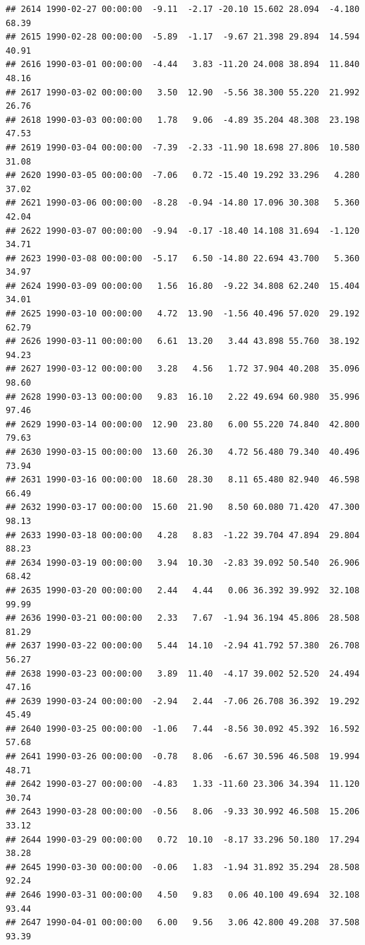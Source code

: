 \documentclass{article}\usepackage{graphicx, color}
\makeatletter
\newenvironment{kframe}{%
 \def\at@end@of@kframe{}%
 \ifinner\ifhmode%
  \def\at@end@of@kframe{\end{minipage}}%
  \begin{minipage}{\columnwidth}%
 \fi\fi%
 \def\FrameCommand##1{\hskip\@totalleftmargin \hskip-\fboxsep
 \colorbox{shadecolor}{##1}\hskip-\fboxsep
     \hskip-\linewidth \hskip-\@totalleftmargin \hskip\columnwidth}%
 \MakeFramed {\advance\hsize-\width
   \@totalleftmargin\z@ \linewidth\hsize
   \@setminipage}}%
 {\par\unskip\endMakeFramed%
 \at@end@of@kframe}
\newenvironment{knitrout}{}{} %
\makeatother
\begin{document}
\begin{knitrout}
\begin{kframe}
\begin{verbatim}
## 2614 1990-02-27 00:00:00  -9.11  -2.17 -20.10 15.602 28.094  -4.180  68.39
## 2615 1990-02-28 00:00:00  -5.89  -1.17  -9.67 21.398 29.894  14.594  40.91
## 2616 1990-03-01 00:00:00  -4.44   3.83 -11.20 24.008 38.894  11.840  48.16
## 2617 1990-03-02 00:00:00   3.50  12.90  -5.56 38.300 55.220  21.992  26.76
## 2618 1990-03-03 00:00:00   1.78   9.06  -4.89 35.204 48.308  23.198  47.53
## 2619 1990-03-04 00:00:00  -7.39  -2.33 -11.90 18.698 27.806  10.580  31.08
## 2620 1990-03-05 00:00:00  -7.06   0.72 -15.40 19.292 33.296   4.280  37.02
## 2621 1990-03-06 00:00:00  -8.28  -0.94 -14.80 17.096 30.308   5.360  42.04
## 2622 1990-03-07 00:00:00  -9.94  -0.17 -18.40 14.108 31.694  -1.120  34.71
## 2623 1990-03-08 00:00:00  -5.17   6.50 -14.80 22.694 43.700   5.360  34.97
## 2624 1990-03-09 00:00:00   1.56  16.80  -9.22 34.808 62.240  15.404  34.01
## 2625 1990-03-10 00:00:00   4.72  13.90  -1.56 40.496 57.020  29.192  62.79
## 2626 1990-03-11 00:00:00   6.61  13.20   3.44 43.898 55.760  38.192  94.23
## 2627 1990-03-12 00:00:00   3.28   4.56   1.72 37.904 40.208  35.096  98.60
## 2628 1990-03-13 00:00:00   9.83  16.10   2.22 49.694 60.980  35.996  97.46
## 2629 1990-03-14 00:00:00  12.90  23.80   6.00 55.220 74.840  42.800  79.63
## 2630 1990-03-15 00:00:00  13.60  26.30   4.72 56.480 79.340  40.496  73.94
## 2631 1990-03-16 00:00:00  18.60  28.30   8.11 65.480 82.940  46.598  66.49
## 2632 1990-03-17 00:00:00  15.60  21.90   8.50 60.080 71.420  47.300  98.13
## 2633 1990-03-18 00:00:00   4.28   8.83  -1.22 39.704 47.894  29.804  88.23
## 2634 1990-03-19 00:00:00   3.94  10.30  -2.83 39.092 50.540  26.906  68.42
## 2635 1990-03-20 00:00:00   2.44   4.44   0.06 36.392 39.992  32.108  99.99
## 2636 1990-03-21 00:00:00   2.33   7.67  -1.94 36.194 45.806  28.508  81.29
## 2637 1990-03-22 00:00:00   5.44  14.10  -2.94 41.792 57.380  26.708  56.27
## 2638 1990-03-23 00:00:00   3.89  11.40  -4.17 39.002 52.520  24.494  47.16
## 2639 1990-03-24 00:00:00  -2.94   2.44  -7.06 26.708 36.392  19.292  45.49
## 2640 1990-03-25 00:00:00  -1.06   7.44  -8.56 30.092 45.392  16.592  57.68
## 2641 1990-03-26 00:00:00  -0.78   8.06  -6.67 30.596 46.508  19.994  48.71
## 2642 1990-03-27 00:00:00  -4.83   1.33 -11.60 23.306 34.394  11.120  30.74
## 2643 1990-03-28 00:00:00  -0.56   8.06  -9.33 30.992 46.508  15.206  33.12
## 2644 1990-03-29 00:00:00   0.72  10.10  -8.17 33.296 50.180  17.294  38.28
## 2645 1990-03-30 00:00:00  -0.06   1.83  -1.94 31.892 35.294  28.508  92.24
## 2646 1990-03-31 00:00:00   4.50   9.83   0.06 40.100 49.694  32.108  93.44
## 2647 1990-04-01 00:00:00   6.00   9.56   3.06 42.800 49.208  37.508  93.39

\end{verbatim}
\end{kframe}
\end{knitrout}
\end{document}
